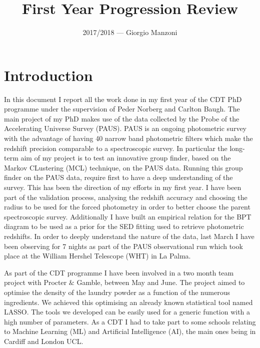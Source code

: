 \documentclass[letterpaper]{article}
\begin{document}
\title{First Year Progression Review} %
\date{ }
\author{2017/2018 --- Giorgio Manzoni}
\maketitle
{}

\tableofcontents

\section{Introduction}

In this document I report all the work done in my first year of the CDT PhD programme under the supervision of Peder Norberg and Carlton Baugh. The main project of my PhD makes use of the data collected by the Probe of the Accelerating Universe Survey (PAUS). PAUS is an ongoing photometric survey with the advantage of having 40 narrow band photometric filters which make the redshift precision comparable to a spectroscopic survey. In particular the long-term aim of my project is to test an innovative group finder, based on the Markov CLustering (MCL) technique, on the PAUS data. Running this group finder on the PAUS data, require first to have a deep understanding of the survey. This has been the direction of my efforts in my first year. I have been part of the validation process, analysing the redshift accuracy and choosing the radius to be used for the forced photometry in order to better choose the parent spectroscopic survey. Additionally I have built an empirical relation for the BPT diagram to be used as a prior for the SED fitting used to retrieve photometric redshifts. In order to deeply understand the nature of the data, last March I have been observing for 7 nights as part of the PAUS observational run which took place at the William Hershel Telescope (WHT) in La Palma. 

As part of the CDT programme I have been involved in a two month team project with Procter $\&$ Gamble, between May and June. The project aimed to optimise the density of the laundry powder as a function of the numerous ingredients. We achieved this optimising an already known statistical tool named LASSO. The tools we developed can be easily used for a generic function with a high number of parameters. As a CDT I had to take part to some schools relating to Machine Learning (ML) and Artificial Intelligence (AI), the main ones being in Cardiff and London UCL.
\end{document}
